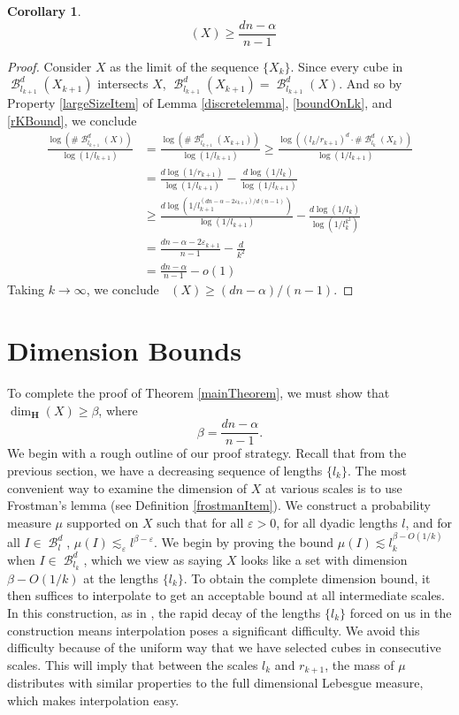 \documentclass[dvipsnames,letterpaper,12pt]{article}
\numberwithin{equation}{section}
\theoremstyle{plain}
\newtheorem{corollary}{Corollary}
\DeclareMathOperator{\upminkdim}{\overline{\dim}_{\mathbf{M}}}
\DeclareMathOperator{\B}{\mathcal{B}}
\begin{document}
\begin{corollary}
	\[ \upminkdim(X) \geq \frac{dn - \alpha}{n - 1} \]
\end{corollary}
\begin{proof}
	Consider $X$ as the limit of the sequence $\{ X_k \}$. Since every cube in $\B^d_{l_{k+1}}(X_{k+1})$ intersects $X$, $\B^d_{l_{k+1}}(X_{k+1}) = \B^d_{l_{k+1}}(X)$. And so by Property \ref{largeSizeItem} of Lemma \ref{discretelemma}, \eqref{boundOnLk}, and \eqref{rKBound}, we conclude
	\begin{align*}
		\frac{\log(\# \B^d_{l_{k+1}}(X))}{\log(1/l_{k+1})} &= \frac{\log(\# \B^d_{l_{k+1}}(X_{k+1}))}{\log(1/l_{k+1})} \geq \frac{\log((l_k/r_{k+1})^d \cdot \# \B^d_{l_k}(X_k))}{\log(1/l_{k+1})}\\
		&= \frac{d \log(1/r_{k+1})}{\log(1/l_{k+1})} - \frac{d \log(1/l_k)}{\log(1/l_{k+1})}\\
		&\geq \frac{d \log \left(1/l_{k+1}^{(dn - \alpha - 2\varepsilon_{k+1})/d(n-1)} \right)}{\log(1/l_{k+1})} - \frac{d \log(1/l_k)}{\log(1/l_k^{k^2})}\\
		&= \frac{dn - \alpha - 2\varepsilon_{k+1}}{n-1} - \frac{d}{k^2}\\
		&= \frac{dn - \alpha}{n-1} - o(1)
	\end{align*}
	Taking $k \to \infty$, we conclude $\upminkdim(X) \geq (dn - \alpha)/(n-1)$.
\end{proof}







\section{Dimension Bounds}\label{dimensionsection}

To complete the proof of Theorem \ref{mainTheorem}, we must show that $\dim_{\mathbf{H}}(X) \geq \beta$, where
%
\[ \beta = \frac{dn - \alpha}{n - 1}. \]
%
We begin with a rough outline of our proof strategy. Recall that from the previous section, we have a decreasing sequence of lengths $\{ l_k \}$. The most convenient way to examine the dimension of $X$ at various scales is to use Frostman's lemma (see Definition \ref{frostmanItem}). We construct a probability measure $\mu$ supported on $X$ such that for all $\varepsilon > 0$, for all dyadic lengths $l$, and for all $I \in \B^d_l$, $\mu(I) \lesssim_\varepsilon l^{\beta - \varepsilon}$. We begin by proving the bound $\mu(I) \lesssim l_k^{\beta - O(1/k)}$ when $I \in \B^d_{l_k}$, which we view as saying $X$ looks like a set with dimension $\beta - O(1/k)$ at the lengths $\{ l_k \}$. To obtain the complete dimension bound, it then suffices to interpolate to get an acceptable bound at all intermediate scales. In this construction, as in \cite{MalabikaRob}, the rapid decay of the lengths $\{ l_k \}$ forced on us in the construction means interpolation poses a significant difficulty. We avoid this difficulty because of the uniform way that we have selected cubes in consecutive scales. This will imply that between the scales $l_k$ and $r_{k+1}$, the mass of $\mu$ distributes with similar properties to the full dimensional Lebesgue measure, which makes interpolation easy.
\end{document}
